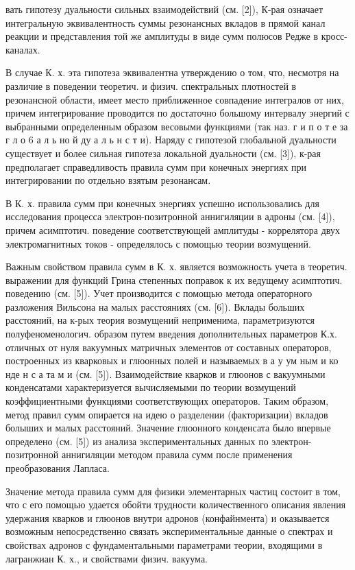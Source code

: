 \documentclass[10pt]{article}
\begin{document}
вать гипотезу дуальности сильных взаимодействий (см. [2]), К-рая означает интегральную эквивалентность суммы резонансных вкладов в прямой канал реакции и представления той же амплитуды в виде сумм полюсов Редже в кросс-каналах.



В случае К. х. эта гипотеза эквивалентна утверждению о том, что, несмотря на различие в поведении теоретич. и физич. спектральных плотностей в резонансной области, имеет место приближенное совпадение интегралов от них, причем интегрирование проводится по достаточно большому интервалу энергий с выбранными определенным образом весовыми функциями (так наз. г и п о т е за г л о 6 а л ь но й ду а л ь н с т и). Наряду с гипотезой глобальной дуальности существует и более сильная гипотеза локальной дуальности (см. [3]), к-рая предполагает справедливость правила сумм при конечных энергиях при интегрировании по отдельно взятым резонансам.



В К. х. правила сумм при конечных энергиях успешно использовались для исследования процесса электрон-позитронной аннигиляции в адроны (см. [4]), причем асимптотич. поведение соответствующей амплитуды - коррелятора двух электромагнитных токов - определялось с помощью теории возмущений.



Важным свойством правила сумм в К. х. является возможность учета в теоретич. выражении для функций Грина степенных поправок к их ведущему асимптотич. поведению (см. [5]). Учет производится с помощью метода операторного разложения Вильсона на малых расстояниях (см. [6]). Вклады больших расстояний, на к-рых теория возмущений неприменима, параметризуются полуфеноменологич. образом путем введения дополнительных параметров К.х. отличных от нуля вакуумных матричных элементов от составных операторов, построенных из кварковых и глюонных полей и называемых в а у ум ным и ко нде н с а та м и (см. [5]). Взаимодействие кварков и глюонов с вакуумными конденсатами характеризуется вычисляемыми по теории возмущений коэффициентными функциями соответствующих операторов. Таким образом, метод правил сумм опирается на идею о разделении (факторизации) вкладов болыших и малых расстояний. Значение глюонного конденсата было впервые определено (см. [5]) из анализа экспериментальных данных по электрон-позитронной аннигиляции методом правила сумм после применения преобразования Лапласа.



Значение метода правила сумм для физики элементарных частиц состоит в том, что с его помощью удается обойти трудности количественного описания явления удержания кварков и глюонов внутри адронов (конфайнмента) и оказывается возможным непосредственно связать экспериментальные данные о спектрах и свойствах адронов с фундаментальными параметрами теории, входящими в лагранжиан К. х., и свойствами физич. вакуума.
\end{document}
